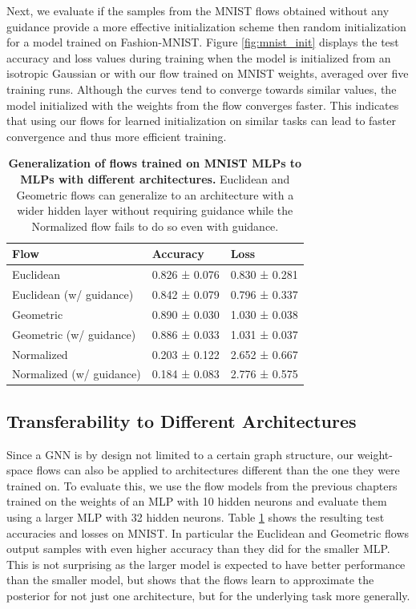 Next, we evaluate if the samples from the MNIST flows obtained without any guidance provide a more effective initialization scheme then random initialization for a model trained on Fashion-MNIST. Figure \ref{fig:mnist_init} displays the test accuracy and loss values during training when the model is initialized from an isotropic Gaussian or with our flow trained on MNIST weights, averaged over five training runs. Although the curves tend to converge towards similar values, the model initialized with the weights from the flow converges faster. This indicates that using our flows for learned initialization on similar tasks can lead to faster convergence and thus more efficient training.

\begin{table}[t!]
    \centering
    \begin{tabular}{lll}
        \toprule
        \textbf{Flow} & \textbf{Accuracy} & \textbf{Loss} \\
        \midrule
        Euclidean                   & 0.826 ± 0.076     & 0.830 ± 0.281 \\
        Euclidean (w/ guidance)     & 0.842 ± 0.079     & 0.796 ± 0.337 \\
        \midrule
        Geometric                  & 0.890 ± 0.030     & 1.030 ± 0.038 \\
        Geometric (w/ guidance)    & 0.886 ± 0.033     & 1.031 ± 0.037 \\
        \midrule
        Normalized                   & 0.203 ± 0.122     & 2.652 ± 0.667 \\
        Normalized (w/ guidance)     & 0.184 ± 0.083     & 2.776 ± 0.575 \\
        \bottomrule
    \end{tabular}
    \caption{\label{tab:arch_mnist_generalization}\textbf{Generalization of flows trained on MNIST MLPs to MLPs with different architectures.} Euclidean and Geometric flows can generalize to an architecture with a wider hidden layer without requiring guidance while the Normalized flow fails to do so even with guidance.}
\end{table}

\subsection{Transferability to Different Architectures} \label{sec:arch_generalization}

Since a GNN is by design not limited to a certain graph structure, our weight-space flows can also be applied to architectures different than the one they were trained on. To evaluate this, we use the flow models from the previous chapters trained on the weights of an MLP with 10 hidden neurons and evaluate them using a larger MLP with 32 hidden neurons. Table \ref{tab:arch_mnist_generalization} shows the resulting test accuracies and losses on MNIST. In particular the Euclidean and Geometric flows output samples with even higher accuracy than they did for the smaller MLP. This is not surprising as the larger model is expected to have better performance than the smaller model, but shows that the flows learn to approximate the posterior for not just one architecture, but for the underlying task more generally. 

